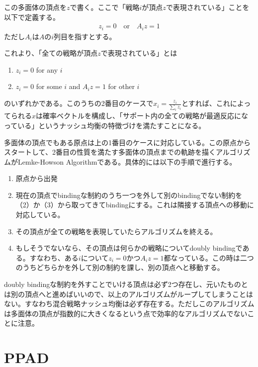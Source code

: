 \documentclass{jsarticle}
\begin{document}
この多面体の頂点を$z$で書く。ここで「戦略$i$が頂点$z$で表現されている」ことを以下で定義する。
\begin{align}
	z_i = 0\quad \text{or}\quad A_i z = 1
\end{align}
ただし$A_i$は$A$の$i$列目を指すとする。

これより、「全ての戦略が頂点$z$で表現されている」とは
\begin{enumerate}
	\item $z_i = 0$ for any $i$
	\item $z_i = 0$ for some $i$ and $A_i z = 1$ for other $i$
\end{enumerate}
のいずれかである。このうちの2番目のケースで$x_i = \frac{z_i}{\sum_i z_i}$とすれば、これによってられる$x$は確率ベクトルを構成し、「サポート内の全ての戦略が最適反応になっている」というナッシュ均衡の特徴づけを満たすことになる。

多面体の頂点でもある原点は上の1番目のケースに対応している。この原点からスタートして、2番目の性質を満たす多面体の頂点までの軌跡を描くアルゴリズムがLemke-Howson Algorithmである。具体的には以下の手順で進行する。

\begin{enumerate}
	\item 原点から出発
	\item 現在の頂点でbindingな制約のうち一つを外して別のbindingでない制約を（2）か（3）から取ってきてbindingにする。これは隣接する頂点への移動に対応している。
	\item その頂点が全ての戦略を表現していたらアルゴリズムを終える。
	\item もしそうでないなら、その頂点は何らかの戦略についてdoubly bindingである。すなわち、ある$i$について$z_i = 0$かつ$A_i z = 1$都なっている。この時は二つのうちどちらかを外して別の制約を課し、別の頂点へと移動する。
\end{enumerate}

doubly bindingな制約を外すことでいける頂点は必ず2つ存在し、元いたものとは別の頂点へと進めばいいので、以上のアルゴリズムがループしてしまうことはない。すなわち混合戦略ナッシュ均衡は必ず存在する。ただしこのアルゴリズムは多面体の頂点が指数的に大きくなるという点で効率的なアルゴリズムでないことに注意。


\section{PPAD}
\end{document}
